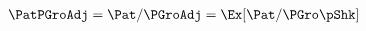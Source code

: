   \begin{equation}\begin{gathered}\begin{aligned}
    \PatPGroAdj  & = \Pat/\PGroAdj = \Ex[\Pat/\PGro\pShk]  \label{eq:GPFNrm}
  \end{aligned}\end{gathered}\end{equation}

